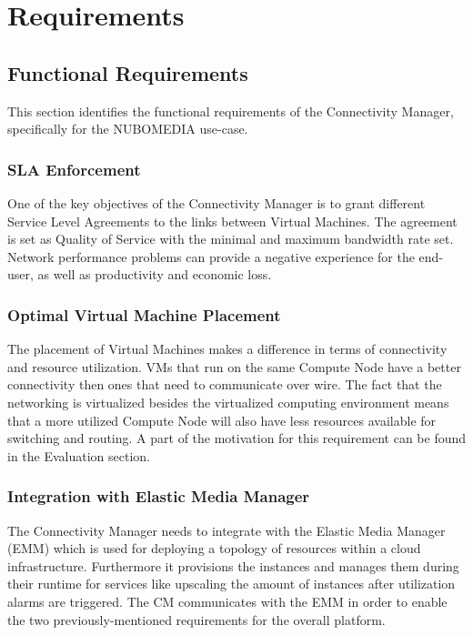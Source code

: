 \chapter{Requirements}

\section{Functional Requirements}

This section identifies the functional requirements of the Connectivity Manager, specifically for the NUBOMEDIA use-case.

\subsection{SLA Enforcement}

One of the key objectives of the Connectivity Manager is to grant different Service Level Agreements to the links between Virtual Machines. The agreement is set as Quality of Service with the minimal and maximum bandwidth rate set. Network performance problems can provide a negative experience for the end-user, as well as productivity and economic loss.

\subsection{Optimal Virtual Machine Placement}

The placement of Virtual Machines makes a difference in terms of connectivity and resource utilization. VMs that run on the same Compute Node have a better connectivity then ones that need to communicate over wire. The fact that the networking is virtualized besides the virtualized computing environment means that a more utilized Compute Node will also have less resources available for switching and routing. A part of the motivation for this requirement can be found in the Evaluation section.

\subsection{Integration with Elastic Media Manager}

The Connectivity Manager needs to integrate with the Elastic Media Manager (EMM) which is used for deploying a topology of resources within a cloud infrastructure. Furthermore it provisions the instances and manages them during their runtime for services like upscaling the amount of instances after utilization alarms are triggered. The CM communicates with the EMM in order to enable the two previously-mentioned requirements for the overall platform.


